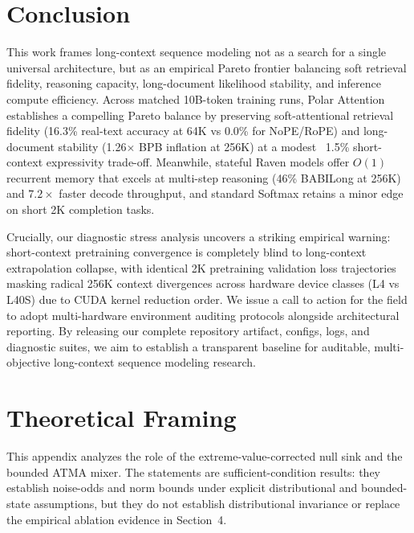 \documentclass{article} %
\begin{document}
\FloatBarrier
\section{Conclusion}
This work frames long-context sequence modeling not as a search for a single universal architecture, but as an empirical Pareto frontier balancing soft retrieval fidelity, reasoning capacity, long-document likelihood stability, and inference compute efficiency. Across matched 10B-token training runs, Polar Attention establishes a compelling Pareto balance by preserving soft-attentional retrieval fidelity (16.3\% real-text accuracy at 64K vs 0.0\% for NoPE/RoPE) and long-document stability (1.26$\times$ BPB inflation at 256K) at a modest ~1.5\% short-context expressivity trade-off. Meanwhile, stateful Raven models offer $O(1)$ recurrent memory that excels at multi-step reasoning (46\% BABILong at 256K) and $7.2\times$ faster decode throughput, and standard Softmax retains a minor edge on short 2K completion tasks.

Crucially, our diagnostic stress analysis uncovers a striking empirical warning: short-context pretraining convergence is completely blind to long-context extrapolation collapse, with identical 2K pretraining validation loss trajectories masking radical 256K context divergences across hardware device classes (L4 vs L40S) due to CUDA kernel reduction order. We issue a call to action for the field to adopt multi-hardware environment auditing protocols alongside architectural reporting. By releasing our complete repository artifact, configs, logs, and diagnostic suites, we aim to establish a transparent baseline for auditable, multi-objective long-context sequence modeling research.




\appendix

\clearpage
\section{Theoretical Framing}
\label{appendix:theory}

This appendix analyzes the role of the extreme-value-corrected null sink and the bounded
ATMA mixer. The statements are sufficient-condition results: they establish noise-odds and
norm bounds under explicit distributional and bounded-state assumptions, but they do not
establish distributional invariance or replace the empirical ablation evidence in Section~4.
\end{document}

